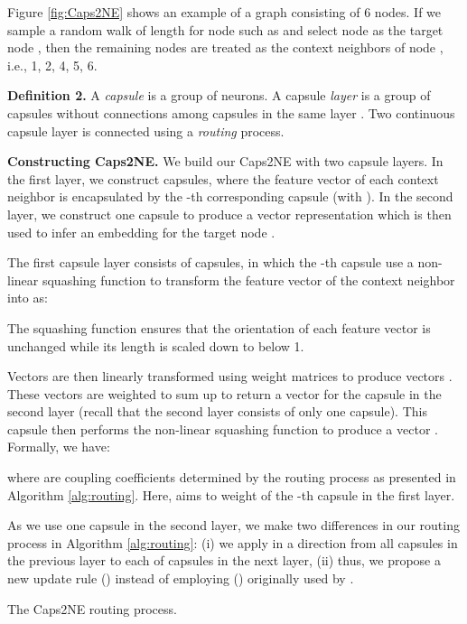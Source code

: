 \documentclass[sigconf]{acmart}
\begin{document}
Figure \ref{fig:Caps2NE} shows an example of a graph consisting of 6 nodes.
If we sample a random walk of length  for node  such as  and select node  as the target node , then the remaining nodes  are  treated as the context neighbors of node , i.e.,    1,   2,   4,   5,  6.


\textbf{Definition 2.} A \textit{capsule} is a group of neurons. A capsule \textit{layer} is a group of capsules without connections among capsules in the same layer \citep{sabour2017dynamic}. Two continuous capsule layer is connected using a \textit{routing} process.

\textbf{Constructing Caps2NE.} We build our Caps2NE with two capsule layers. In the first layer, we construct  capsules, where the feature vector of each context neighbor  is encapsulated by the -th corresponding capsule (with ). 
In the second layer, we construct one capsule to produce a vector representation which is then used to infer an embedding for the target node .


The first capsule layer consists of  capsules, in which the -th capsule use a non-linear squashing function to transform the feature vector  of the context neighbor  into  as: 

\noindent The squashing function ensures that the orientation of each feature vector is unchanged while its length is scaled down to below 1.

Vectors  are then linearly transformed using weight matrices  to produce vectors . 
These vectors   are weighted to sum up to return a vector   for the capsule in the second layer (recall that the second layer consists of only one  capsule).
This capsule then performs the non-linear squashing function to produce a vector . 
Formally, we have:

where  are coupling coefficients determined by the routing process as presented in Algorithm \ref{alg:routing}. Here, 
 aims to weight  of the -th capsule in the first layer. 

As we use one capsule in the second layer, we make two differences in our routing process  in Algorithm \ref{alg:routing}: (i) we apply   in a direction from all capsules in the previous layer to each of capsules in the next layer, 
(ii) thus, we propose a new update rule () instead of employing () originally used by  \citet{sabour2017dynamic}.

\begin{algorithm}
\caption{The Caps2NE routing process.}
\label{alg:routing}
\DontPrintSemicolon
\SetAlgoVlined
{}
\end{algorithm}
\end{document}
